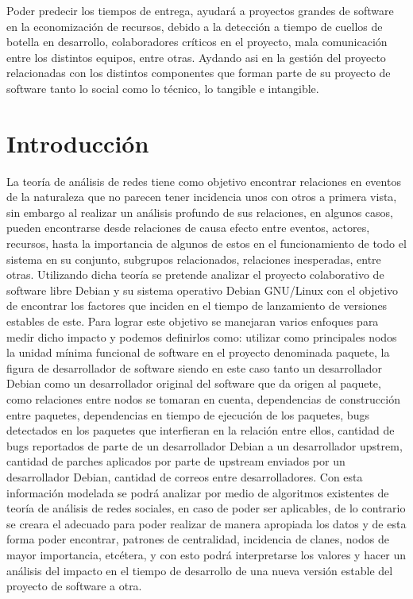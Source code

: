 \documentclass[12pt]{report}
\begin{document}
Poder predecir los tiempos de  entrega, ayudará a proyectos grandes de
software  en la  economización de  recursos, debido  a la  detección a
tiempo de cuellos de botella  en desarrollo, colaboradores críticos en
el  proyecto, mala  comunicación  entre los  distintos equipos,  entre
otras. Aydando  asi en  la gestión del  proyecto relacionadas  con los
distintos  componentes que  forman parte  de su  proyecto de  software
tanto lo social como lo técnico, lo tangible e intangible.

\chapter*{Introducción}  La teoría  de  análisis de  redes tiene  como
objetivo  encontrar relaciones  en  eventos de  la  naturaleza que  no
parecen tener incidencia  unos con otros a primera  vista, sin embargo
al realizar un análisis profundo  de sus relaciones, en algunos casos,
pueden  encontrarse desde  relaciones de  causa efecto  entre eventos,
actores,  recursos, hasta  la importancia  de algunos  de estos  en el
funcionamiento  de   todo  el   sistema  en  su   conjunto,  subgrupos
relacionados,  relaciones inesperadas,  entre otras.  Utilizando dicha
teoría se pretende analizar el proyecto colaborativo de software libre
Debian  y su  sistema operativo  Debian GNU/Linux  con el  objetivo de
encontrar  los factores  que inciden  en el  tiempo de  lanzamiento de
versiones estables  de este.  Para  lograr este objetivo  se manejaran
varios enfoques  para medir dicho  impacto y podemos  definirlos como:
utilizar como principales nodos la unidad mínima funcional de software
en  el proyecto  denominada  paquete, la  figura  de desarrollador  de
software siendo  en este  caso tanto un  desarrollador Debian  como un
desarrollador original  del software  que da  origen al  paquete, como
relaciones  entre   nodos  se  tomaran  en   cuenta,  dependencias  de
construcción entre  paquetes, dependencias  en tiempo de  ejecución de
los paquetes,  bugs detectados en  los paquetes que interfieran  en la
relación  entre ellos,  cantidad de  bugs  reportados de  parte de  un
desarrollador Debian  a un desarrollador upstrem,  cantidad de parches
aplicados por parte de upstream  enviados por un desarrollador Debian,
cantidad  de  correos  entre  desarrolladores.  Con  esta  información
modelada  se podrá  analizar  por medio  de  algoritmos existentes  de
teoría de análisis de redes sociales, en caso de poder ser aplicables,
de lo  contrario se creara el  adecuado para poder realizar  de manera
apropiada  los datos  y de  esta  forma poder  encontrar, patrones  de
centralidad,  incidencia  de  clanes,   nodos  de  mayor  importancia,
etcétera,  y con  esto  podrá  interpretarse los  valores  y hacer  un
análisis del impacto  en el tiempo de desarrollo de  una nueva versión
estable del proyecto de software a otra.
\end{document}
